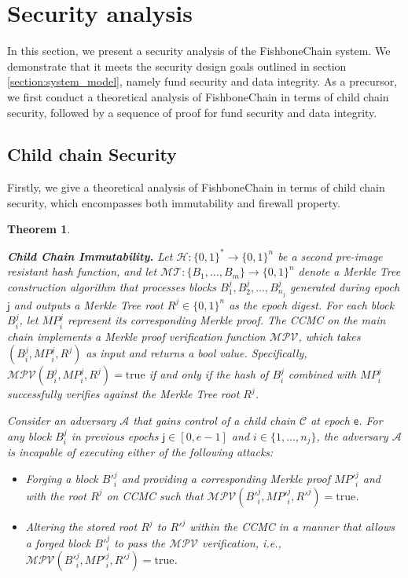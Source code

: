\documentclass[10pt,journal]{IEEEtran}
\newtheorem{theorem}{Theorem}
\begin{document}
\section{Security analysis }\label{section:security_analysis}
In this section, we present a security analysis of the FishboneChain system. We demonstrate that it meets the security design goals outlined in section \ref{section:system_model}, namely fund security and data integrity. As a precursor, we first conduct a theoretical analysis of FishboneChain in terms of child chain security, followed by a sequence of proof for fund security and data integrity.

\subsection{Child chain Security}

Firstly, we give a theoretical analysis of FishboneChain in terms of child chain security, which encompasses both immutability and firewall property. 

\begin{theorem}\label{thm_child_chain_immutability}

    \textbf{Child Chain Immutability.} Let $\mathcal{H}: \{0,1\}^* \rightarrow \{0,1\}^n$ be a second pre-image resistant hash function, and let $\mathcal{MT}: \{B_1, \dots , B_m\} \rightarrow \{0,1\}^n$ denote a Merkle Tree construction algorithm that processes blocks $B^j_1, B^j_2, \dots, B^j_{n_j}$ generated during epoch $\mathsf{j}$ and outputs a Merkle Tree root $R^j \in \{0,1\}^n$ as the epoch digest. For each block $B^j_i$, let $MP^j_i$ represent its corresponding Merkle proof. The CCMC on the main chain implements a Merkle proof verification function $\mathcal{MPV}$, which takes $(B^j_i, MP^j_i, R^j)$ as input and returns a bool value. Specifically, $\mathcal{MPV}(B^j_i, MP^j_i, R^j) = \text{true}$ if and only if the hash of $B^j_i$ combined with $MP^j_i$ successfully verifies against the Merkle Tree root $R^j$.

    Consider an adversary $\mathcal{A}$ that gains control of a child chain $\mathcal{C}$ at epoch $\mathsf{e}$. For any block $B^j_i$ in previous epochs $\mathsf{j} \in [0, e-1]$ and $i \in \{1, \dots, n_j\}$, the adversary $\mathcal{A}$ is incapable of executing either of the following attacks:
    \begin{itemize}
    \item Forging a block $B'^j_i$ and providing a corresponding Merkle proof $MP'^j_i$ and with the root $R^j$ on CCMC such that $\mathcal{MPV}(B'^j_i, MP'^j_i, R'^j) = \text{true}$.
    \item Altering the stored root $R^j$ to $R'^j$ within the CCMC in a manner that allows a forged block $B'^j_i$ to pass the $\mathcal{MPV}$ verification, i.e., $\mathcal{MPV}(B'^j_i, MP'^j_i, R'^j) = \text{true}$.
    \end{itemize}
\end{theorem}
\end{document}
